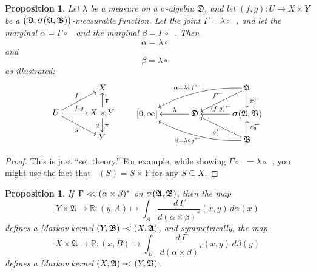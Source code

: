 \documentclass[
twoside=true,
paper=letter,
fontsize=9pt,
pagesize=auto,
leqno,
openany,
headsepline,
overfullrule,
]{scrbook}
\theoremstyle{plain}
\theoremstyle{plain}
\newtheorem{prop}[thm]{Proposition}
\theoremstyle{definition}
\theoremstyle{bfnoteitalic}
\theoremstyle{bfnoteroman}
\newcommand{\sigalg}[1]{\mathfrak{#1}}
\newcommand{\sagb}{\mathop{\hbox{\large{$\sigma$}}}\nolimits}
\newcommand{\textsigma}{\hbox{\large{$\sigma$}}\kern-1pt}
\newcommand{\preimage}[1]{\mathop{#1^{\leftarrow}}}
\newcommand{\R}{\mathbb{R}}
\newcommand{\sigmaalgebra}{\sigalg{A}}
\newcommand{\sigmaalgebraii}{\sigalg{B}}
\newcommand{\productsig}[2]{\sagb(#1,#2)}
\newcommand{\funcf}{f}
\newcommand{\funcg}{g}
\newcommand{\measurespace}{X}
\newcommand{\measurespaceii}{Y}
\newcommand{\mspaceelt}{x}
\newcommand{\mspaceeltii}{y}
\newcommand{\abscont}{\mathrel{< \kern-3.5pt <}}
\newcommand{\measlambda}{\lambda}
\newcommand{\seti}{A}
\newcommand{\setii}{B}
\newcommand{\projectionone}{\pi_1}
\newcommand{\projectiontwo}{\pi_2}
\newcommand{\uspace}{U}%
\newcommand{\uspacesig}{\sigalg{D}}
\newcommand{\transition}{\,-\kern-6pt <}
\newcommand{\measonprod}{\Gamma}%
\newcommand{\marginalone}{\alpha}%
\newcommand{\marginaltwo}{\beta}%
\begin{document}
\begin{prop}\label{induced_marginals}
Let $\measlambda$ be a measure on a \textsigma-algebra
$\uspacesig$,
and let
$(\funcf,\funcg):\uspace\to \measurespace  \times \measurespaceii $
be a
$\bigl(\uspacesig,\productsig{\sigmaalgebra}{\sigmaalgebraii}\bigr)$\hyp{}measurable
function.
Let the joint
$\measonprod
=
\measlambda\circ\preimage{(\funcf,\funcg)}$,
and let the marginal
$\marginalone
=
\measonprod\circ\preimage{\projectionone}$
and the marginal
$\marginaltwo
=
\measonprod\circ\preimage{\projectiontwo}$.
Then
\[
\marginalone
=
\measlambda\circ\preimage{\funcf}
\]
and
\[
\marginaltwo
=
\measlambda\circ\preimage{\funcg}
\]
as illustrated:
\[
\xymatrix@R=16pt@C=30pt{
 & \measurespace
 \\
 \uspace
 \ar[ur]^{\funcf}
 \ar[dr]_{\funcg}
 \ar[r]^{\funcf, \funcg} &
 \measurespace \times \measurespaceii  \ar[u]_\projectionone \ar[d]^\projectiontwo
 \\
 & \measurespaceii  \\
}
\qquad
\xymatrix@R=16pt@C=34pt{
 & & \sigmaalgebra
 \ar[dl]_{\preimage{\funcf}}
 \ar[d]^{\preimage{\projectionone}}
 \ar@/_10pt/[lld]_{\makebox[0pt][r]{$\scriptstyle{\marginalone} = $}\measlambda\circ\preimage{\funcf}}
 \\
 [0,\infty] & \uspacesig \ar[l]_-{\measlambda} &
 \productsig{\sigmaalgebra}{\sigmaalgebraii}
 \ar[l]_{\preimage{(\funcf,\funcg)}}
 \\
 & & \sigmaalgebraii
  \ar[u]_{\preimage{\projectiontwo}}
  \ar[ul]^{\preimage{\funcg}}
  \ar@/^10pt/[llu]^{\makebox[0pt][r]{$\scriptstyle{\marginaltwo} = $}\measlambda\circ\preimage{\funcg}}
  \\
}
\]
\end{prop}

\begin{proof}
This is just ``set theory.''  For example, while showing
$\measonprod \circ \preimage{\projectionone}
=
\measlambda\circ\preimage{\funcf}$,
you might use the fact that
$\preimage{\projectionone}(S) = S\times \measurespaceii $ for any $S\subseteq \measurespace $.
\end{proof}


\begin{prop}\label{marginal_implies_markov}
If\,
$\measonprod \abscont (\marginalone\times\marginaltwo)^*$
on
$\productsig{\sigmaalgebra}{\sigmaalgebraii}$,
then the map
\[
\measurespaceii\times\sigmaalgebra\to \R
:(\mspaceeltii,\seti)\mapsto
\int_\seti
\dfrac{d\,\measonprod}{d(\marginalone\times\marginaltwo)^*}
(\mspaceelt,\mspaceeltii)\, d\marginalone(\mspaceelt)
\]
defines a Markov kernel
$(\measurespaceii,\sigmaalgebraii)\transition (\measurespace, \sigmaalgebra)$,
and symmetrically, the map
\[
\measurespace\times\sigmaalgebra\to \R
:(\mspaceelt,\setii)\mapsto
\int_\setii
\dfrac{d\,\measonprod}{d(\marginalone\times\marginaltwo)^*}
(\mspaceelt,\mspaceeltii)\, d\marginaltwo(\mspaceeltii)
\]
defines a Markov kernel
$(\measurespace,\sigmaalgebra)\transition (\measurespaceii, \sigmaalgebraii)$.
\end{prop}
\end{document}
